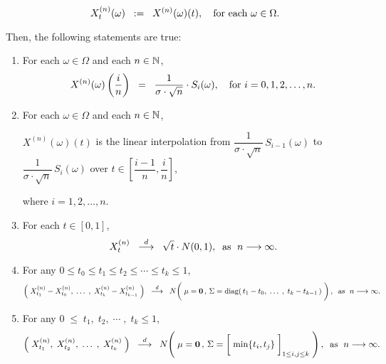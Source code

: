 \begin{proposition}
\begin{itemize}
\begin{equation*}
		X^{(n)}_{t}(\omega) \;\; := \;\; X^{(n)}(\omega)(t),
		\quad
		\textnormal{for each $\omega \in \Omega$}.
		\end{equation*}
\end{itemize}
Then, the following statements are true:
\begin{enumerate}
\item	For each $\omega \in \Omega$ and each $n \in \mathbb{N}$,
		\begin{equation*}
		X^{(n)}(\omega)\left(\dfrac{i}{n}\right) \;\; = \;\; \dfrac{1}{\sigma\cdot\sqrt{n}}\cdot S_{i}(\omega),
		\quad
		\textnormal{for $i = 0, 1, 2, \ldots, n$}.
		\end{equation*}
\item	For each $\omega \in \Omega$ and each $n \in \mathbb{N}$, 
		\begin{center}
		$X^{(n)}(\omega)(t)$\; is the linear interpolation
		from \;$\dfrac{1}{\sigma\cdot\sqrt{n}}\,S_{i-1}(\omega)$\;
		to \;$\dfrac{1}{\sigma\cdot\sqrt{n}}\,S_{i}(\omega)$\;
		over \;$t \in \left[\dfrac{i-1}{n},\dfrac{i}{n}\right]$,
		\end{center}
		where $i = 1, 2, \ldots, n$.
\item	For each $t \in [0,1]$,
		\begin{equation*}
		X^{(n)}_{t} \;\; \overset{d}{\longrightarrow} \;\; \sqrt{t}\cdot N(0,1),
		\;\;\textnormal{as \;$n \longrightarrow \infty$}.
		\end{equation*}
\item	For any \;$0 \leq t_{0} \leq t_{1} \leq t_{2} \leq \cdots \leq t_{k} \leq 1$,
		\begin{equation*}
		\left(\;X^{(n)}_{t_{1}} - X^{(n)}_{t_{0}}, \;\ldots\;,\; X^{(n)}_{t_{k}} - X^{(n)}_{t_{k-1}}\;\right)
		\;\; \overset{d}{\longrightarrow} \;\;
		N\!\left(\;
		\mathbf{\mu} = \mathbf{0}\,,\,
		\overset{{\color{white}1}}{\Sigma} = \diag\!\left(\,t_{1}-t_{0},\; \ldots\; ,\; t_{k}-t_{k-1}\,\right)
		\;\right),
		\;\;
		\textnormal{as \;$n \longrightarrow \infty$}.
		\end{equation*}
\item	For any \;$0 \;\leq\; t_{1},\; t_{2}, \;\cdots\;,\; t_{k} \leq 1$,
		\begin{equation*}
		\left(\;X^{(n)}_{t_{1}},\; X^{(n)}_{t_{2}}, \;\ldots\;,\; X^{(n)}_{t_{k}}\;\right)
		\;\; \overset{d}{\longrightarrow} \;\;
		N\!\left(\;
		\mathbf{\mu} = \mathbf{0}\,,\,
		\Sigma = \left[\;\min\{\overset{{\color{white}1}}{t}_{i},t_{j}\}\;\right]_{1\leq i,j\leq k}
		\;\right),
		\;\;\textnormal{as \;$n \longrightarrow \infty$}.
		\end{equation*}
\end{enumerate}
\end{proposition}
\proof

